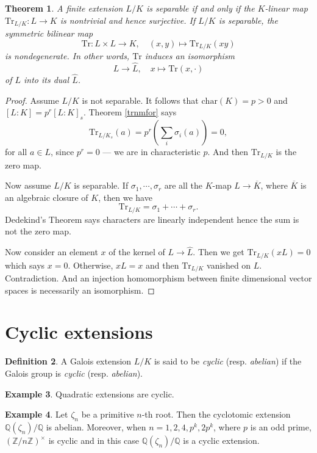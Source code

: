 \documentclass[12pt]{report}
\newtheorem{thm}{Theorem}[section]
\theoremstyle{definition}
\newtheorem{defn}[thm]{Definition}
\newtheorem{example}[thm]{Example}
\def\ZZ{\mathbb{Z}}
\def\QQ{\mathbb{Q}}
\def\Tr{\text{Tr}}
\def\char{\text{char}}
\def\ok{\overline{K}}
\begin{document}
\begin{thm}
    A finite extension $L/K$ is separable if and only if the $K$-linear map $\Tr_{L/K}: L\to K$ is nontrivial and hence surjective. If $L/K$ is separable, the symmetric bilinear map $$\Tr:L\times L\to K,\quad (x,y)\mapsto \Tr_{L/K}(xy)$$ is nondegenerate. In other words, $\Tr$ induces an isomorphism $$L\to \hat{L}, \quad x\mapsto \Tr(x,\cdot)$$ of $L$ into its dual $\hat{L}$.
\end{thm}

\begin{proof}
    Assume $L/K$ is not separable. It follows that $\char(K)=p>0$ and $[L:K]=p^r[L:K]_s$. Theorem \ref{trnmfor} says $$\Tr_{L/K_s}(a)=p^r(\sum_i \sigma_i(a))=0,$$ for all $a\in L$, since $p^r=0$ --- we are in characteristic $p$. And then $\Tr_{L/K}$ is the zero map.


    
    Now assume $L/K$ is separable. If $\sigma_1,\cdots,\sigma_r$ are all the $K$-map $L\to\overline{K}$, where $\ok$ is an algebraic closure of $K$, then we have $$\Tr_{L/K}=\sigma_1+\cdots+\sigma_r.$$ Dedekind's Theorem says characters are linearly independent hence the sum is not the zero map.


    Now consider an element $x$ of the kernel of $L\to \hat{L}$. Then we get $\Tr_{L/K}(xL)=0$ which says $x=0$. Otherwise, $xL=x$ and then $\Tr_{L/K}$ vanished on $L$. Contradiction. And an injection homomorphism between finite dimensional vector spaces is necessarily an isomorphism. 
\end{proof}

\section{Cyclic extensions}

\begin{defn}
    A Galois extension $L/K$ is said to be \emph{cyclic} (resp. \emph{abelian}) if the Galois group is \emph{cyclic} (resp. \emph{abelian}).
\end{defn}

\begin{example}
    Quadratic extensions are cyclic.
\end{example}

\begin{example}
    Let $\zeta_n$ be a primitive $n$-th root. Then the cyclotomic extension $\QQ(\zeta_n)/\QQ$ is abelian. Moreover, when $n=1,2,4,p^k,2p^k$, where $p$ is an odd prime, $(\ZZ/n\ZZ)^\times$ is cyclic and in this case $\QQ(\zeta_n)/\QQ$ is a cyclic extension.
\end{example}
\end{document}
